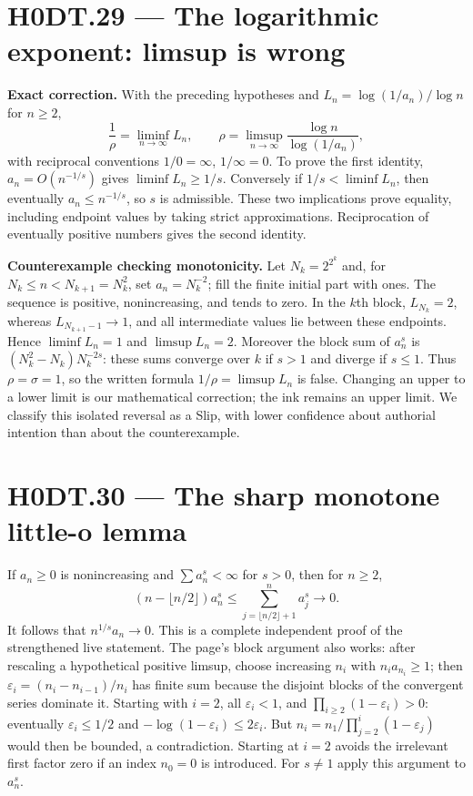 \section*{H0DT.29 --- The logarithmic exponent: limsup is wrong}
\textbf{Exact correction.} With the preceding hypotheses and $L_n=\log(1/a_n)/\log n$ for $n\ge2$,
\[
 \frac1\rho=\liminf_{n\to\infty}L_n,
 \qquad
 \rho=\limsup_{n\to\infty}\frac{\log n}{\log(1/a_n)},
\]
with reciprocal conventions $1/0=\infty$, $1/\infty=0$. To prove the first identity, $a_n=O(n^{-1/s})$ gives $\liminf L_n\ge1/s$. Conversely if $1/s<\liminf L_n$, then eventually $a_n\le n^{-1/s}$, so $s$ is admissible. These two implications prove equality, including endpoint values by taking strict approximations. Reciprocation of eventually positive numbers gives the second identity.

\textbf{Counterexample checking monotonicity.} Let $N_k=2^{2^k}$ and, for $N_k\le n<N_{k+1}=N_k^2$, set $a_n=N_k^{-2}$; fill the finite initial part with ones. The sequence is positive, nonincreasing, and tends to zero. In the $k$th block,
$L_{N_k}=2$, whereas $L_{N_{k+1}-1}\to1$, and all intermediate values lie between these endpoints. Hence $\liminf L_n=1$ and $\limsup L_n=2$. Moreover the block sum of $a_n^s$ is $(N_k^2-N_k)N_k^{-2s}$: these sums converge over $k$ if $s>1$ and diverge if $s\le1$. Thus $\rho=\sigma=1$, so the written formula $1/\rho=\limsup L_n$ is false. Changing an upper to a lower limit is our mathematical correction; the ink remains an upper limit. We classify this isolated reversal as a Slip, with lower confidence about authorial intention than about the counterexample.

\section*{H0DT.30 --- The sharp monotone little-o lemma}
If $a_n\ge0$ is nonincreasing and $\sum a_n^s<\infty$ for $s>0$, then for $n\ge2$,
\[
 (n-\lfloor n/2\rfloor)a_n^s
 \le\sum_{j=\lfloor n/2\rfloor+1}^n a_j^s\longrightarrow0.
\]
It follows that $n^{1/s}a_n\to0$. This is a complete independent proof of the strengthened live statement. The page's block argument also works: after rescaling a hypothetical positive limsup, choose increasing $n_i$ with $n_i a_{n_i}\ge1$; then $\varepsilon_i=(n_i-n_{i-1})/n_i$ has finite sum because the disjoint blocks of the convergent series dominate it. Starting with $i=2$, all $\varepsilon_i<1$, and $\prod_{i\ge2}(1-\varepsilon_i)>0$: eventually $\varepsilon_i\le1/2$ and $-\log(1-\varepsilon_i)\le2\varepsilon_i$. But $n_i=n_1/\prod_{j=2}^i(1-\varepsilon_j)$ would then be bounded, a contradiction. Starting at $i=2$ avoids the irrelevant first factor zero if an index $n_0=0$ is introduced. For $s\ne1$ apply this argument to $a_n^s$.

